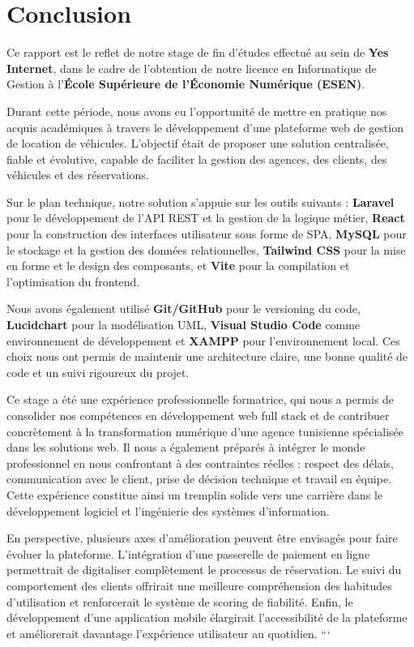 \chapter*{Conclusion}

Ce rapport est le reflet de notre stage de fin d'études effectué au sein de
\textbf{Yes Internet}, dans le cadre de l'obtention de notre licence en
Informatique de Gestion à l'\textbf{École Supérieure de l'Économie Numérique (ESEN)}.

Durant cette période, nous avons eu l'opportunité de mettre en pratique nos acquis
académiques à travers le développement d'une plateforme web de gestion de
location de véhicules. L'objectif était de proposer une solution centralisée,
fiable et évolutive, capable de faciliter la gestion des agences, des
clients, des véhicules et des réservations.

Sur le plan technique, notre solution s'appuie sur les outils suivants :
\textbf{Laravel} pour le développement de l'API REST et la gestion de la
logique métier, \textbf{React} pour la construction des interfaces utilisateur
sous forme de SPA, \textbf{MySQL} pour le stockage et la gestion des données
relationnelles, \textbf{Tailwind CSS} pour la mise en forme et le design des
composants, et \textbf{Vite} pour la compilation et l'optimisation du frontend.

Nous avons également utilisé \textbf{Git/GitHub} pour le versioning du code,
\textbf{Lucidchart} pour la modélisation UML, \textbf{Visual Studio Code} comme
environnement de développement et \textbf{XAMPP} pour l'environnement local.
Ces choix nous ont permis de maintenir une architecture claire, une bonne
qualité de code et un suivi rigoureux du projet.

Ce stage a été une expérience professionnelle formatrice, qui nous a permis
de consolider nos compétences en développement web full stack et de contribuer
concrètement à la transformation numérique d'une agence tunisienne spécialisée
dans les solutions web. Il nous a également préparés à intégrer le monde
professionnel en nous confrontant à des contraintes réelles : respect des délais,
communication avec le client, prise de décision technique et travail en équipe.
Cette expérience constitue ainsi un tremplin solide vers une carrière dans le
développement logiciel et l'ingénierie des systèmes d'information.

En perspective, plusieurs axes d'amélioration peuvent être envisagés pour
faire évoluer la plateforme. L'intégration d'une passerelle de paiement en ligne
permettrait de digitaliser complètement le processus de réservation. Le suivi
du comportement des clients offrirait une meilleure compréhension des habitudes
d'utilisation et renforcerait le système de scoring de fiabilité. Enfin, le
développement d'une application mobile élargirait l'accessibilité de la
plateforme et améliorerait davantage l'expérience utilisateur au quotidien.
```
